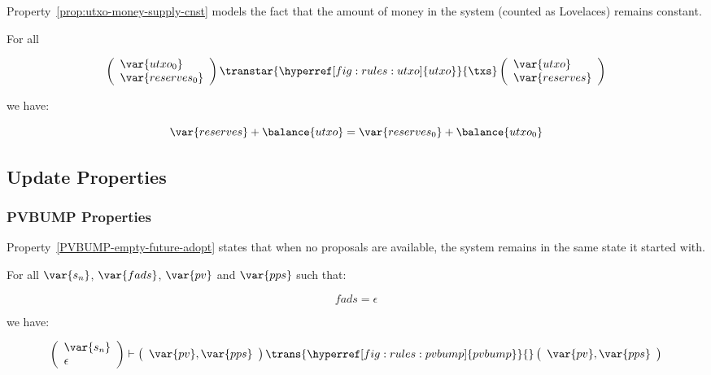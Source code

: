 Property~\ref{prop:utxo-money-supply-cnst} models the fact that the amount of
money in the system (counted as Lovelaces) remains constant.

\begin{property}\label{prop:utxo-money-supply-cnst}
  For all

  $$
  \left(
    \begin{array}{l}
      \var{utxo_0}\\
      \var{reserves_0}
    \end{array}
  \right)
  \transtar{\hyperref[fig:rules:utxo]{utxo}}{\txs}
  \left(
    \begin{array}{l}
      \var{utxo}\\
      \var{reserves}
    \end{array}
  \right)
  $$

  we have:

  $$ \var{reserves} + \balance{utxo} =  \var{reserves_0} + \balance{utxo_0} $$
\end{property}

\subsection{Update Properties}
\label{sec:update-properties}

\subsubsection{PVBUMP Properties}
\label{sec:pvbump-properties}

Property~\ref{PVBUMP-empty-future-adopt} states that when no proposals are
available, the system remains in the same state it started with.

\begin{property}\label{PVBUMP-empty-future-adopt}
  \textnormal{For all $\var{s_n}$, $\var{fads}$, $\var{pv}$ and $\var{pps}$ such
  that:}

  $$fads = \epsilon$$

  \textnormal{we have:}

  $$
  \left(
    \begin{array}{l}
      \var{s_n}\\
      \epsilon
    \end{array}
  \right)
  \vdash
  \left(
    \begin{array}{l}
      \var{pv}, \var{pps}\\
    \end{array}
  \right)
  \trans{\hyperref[fig:rules:pvbump]{pvbump}}{}
  \left(
    \begin{array}{l}
      \var{pv}, \var{pps}\\
    \end{array}
  \right)
  $$
\end{property}


